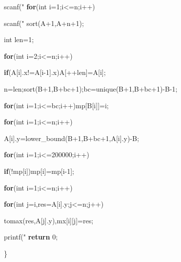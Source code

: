 \documentclass[
]{article}
\newenvironment{Shaded}{}{}
\newcommand{\ControlFlowTok}[1]{\textcolor[rgb]{0.00,0.44,0.13}{\textbf{#1}}}
\newcommand{\DataTypeTok}[1]{\textcolor[rgb]{0.56,0.13,0.00}{#1}}
\newcommand{\DecValTok}[1]{\textcolor[rgb]{0.25,0.63,0.44}{#1}}
\newcommand{\NormalTok}[1]{#1}
\newcommand{\SpecialCharTok}[1]{\textcolor[rgb]{0.25,0.44,0.63}{#1}}
\newcommand{\StringTok}[1]{\textcolor[rgb]{0.25,0.44,0.63}{#1}}
\begin{document}
\begin{Shaded}
\begin{Highlighting}[]
{}
\NormalTok{    scanf(}\StringTok{"}\SpecialCharTok{%d%d}\StringTok{"}\NormalTok{,&n,&S);
}
    \ControlFlowTok{for}\NormalTok{(}\DataTypeTok{int}\NormalTok{ i=}\DecValTok{1}\NormalTok{;i<=n;i++)
}
\NormalTok{        scanf(}\StringTok{"}\SpecialCharTok{%d%d}\StringTok{"}\NormalTok{,&A[i].x,&A[i].y),B[++bc]=A[i].y;
}
\NormalTok{    sort(A+}\DecValTok{1}\NormalTok{,A+n+}\DecValTok{1}\NormalTok{);
}
    \DataTypeTok{int}\NormalTok{ len=}\DecValTok{1}\NormalTok{;
}
    \ControlFlowTok{for}\NormalTok{(}\DataTypeTok{int}\NormalTok{ i=}\DecValTok{2}\NormalTok{;i<=n;i++)
}
        \ControlFlowTok{if}\NormalTok{(A[i].x!=A[i-}\DecValTok{1}\NormalTok{].x)A[++len]=A[i];
}
\NormalTok{    n=len;sort(B+}\DecValTok{1}\NormalTok{,B+bc+}\DecValTok{1}\NormalTok{);bc=unique(B+}\DecValTok{1}\NormalTok{,B+bc+}\DecValTok{1}\NormalTok{)-B-}\DecValTok{1}\NormalTok{;
}
    \ControlFlowTok{for}\NormalTok{(}\DataTypeTok{int}\NormalTok{ i=}\DecValTok{1}\NormalTok{;i<=bc;i++)mp[B[i]]=i;
}
    \ControlFlowTok{for}\NormalTok{(}\DataTypeTok{int}\NormalTok{ i=}\DecValTok{1}\NormalTok{;i<=n;i++)
}
\NormalTok{        A[i].y=lower_bound(B+}\DecValTok{1}\NormalTok{,B+bc+}\DecValTok{1}\NormalTok{,A[i].y)-B;
}
    \ControlFlowTok{for}\NormalTok{(}\DataTypeTok{int}\NormalTok{ i=}\DecValTok{1}\NormalTok{;i<=}\DecValTok{200000}\NormalTok{;i++)
}
        \ControlFlowTok{if}\NormalTok{(!mp[i])mp[i]=mp[i-}\DecValTok{1}\NormalTok{];
}
    \ControlFlowTok{for}\NormalTok{(}\DataTypeTok{int}\NormalTok{ i=}\DecValTok{1}\NormalTok{;i<=n;i++)
}
        \ControlFlowTok{for}\NormalTok{(}\DataTypeTok{int}\NormalTok{ j=i,res=A[i].y;j<=n;j++)
}
\NormalTok{            tomax(res,A[j].y),mx[i][j]=res; 
}
\NormalTok{    printf(}\StringTok{"}\SpecialCharTok{%d\textbackslash{}n}\StringTok{"}\NormalTok{,dfs(}\DecValTok{1}\NormalTok{,n,}\DecValTok{0}\NormalTok{));
}
    \ControlFlowTok{return} \DecValTok{0}\NormalTok{;
}
\NormalTok{\}}
\end{Highlighting}
\end{Shaded}
\end{document}
